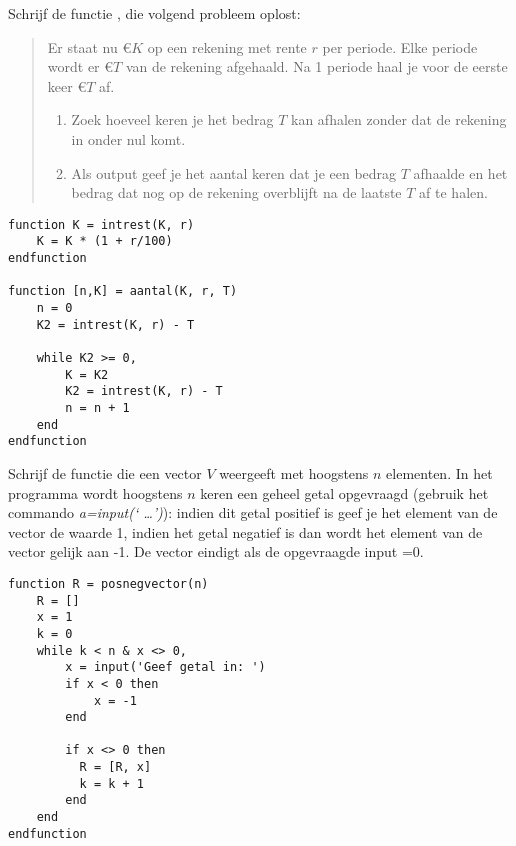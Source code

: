 \begin{oef}
Schrijf de functie , die volgend probleem oplost:
\begin{quote}
Er staat nu \euro $K$  op een rekening met  rente $r$  per periode.
Elke periode wordt er \euro ${T}$ van de  rekening afgehaald. 
Na 1 periode haal je voor de eerste keer \euro ${T}$ af.
\begin{enumerate}
    \item Zoek hoeveel keren je het bedrag $T$ kan afhalen zonder dat de rekening in onder nul komt.
    \item Als output geef je het aantal keren dat je een bedrag 
          $T$ afhaalde en het bedrag dat nog op de rekening overblijft na 
          de laatste $T$ af te halen.
\end{enumerate}  
\end{quote}
\begin{opl}
\begin{lstlisting}
function K = intrest(K, r)
    K = K * (1 + r/100)
endfunction

function [n,K] = aantal(K, r, T)
    n = 0
    K2 = intrest(K, r) - T
    
    while K2 >= 0,
        K = K2
        K2 = intrest(K, r) - T
        n = n + 1
    end
endfunction
\end{lstlisting}
\end{opl}
\end{oef}

\begin{oef}
Schrijf de functie  die een vector $V$ 
weergeeft met hoogstens $n$ elementen. In het programma wordt hoogstens $n$ keren 
een geheel getal opgevraagd (gebruik het commando \emph{a=input(`  \ldots')}):
indien dit getal positief is geef je  het element van de vector de waarde 1, 
indien het getal negatief is dan wordt het element van de vector gelijk aan -1.
De vector eindigt als de opgevraagde input =0.
\begin{opl}
\begin{lstlisting}
function R = posnegvector(n)
    R = []
    x = 1
    k = 0
    while k < n & x <> 0,
        x = input('Geef getal in: ')
        if x < 0 then
            x = -1
        end
        
        if x <> 0 then
          R = [R, x]
          k = k + 1
        end
    end
endfunction
\end{lstlisting}
\end{opl}
\end{oef}


